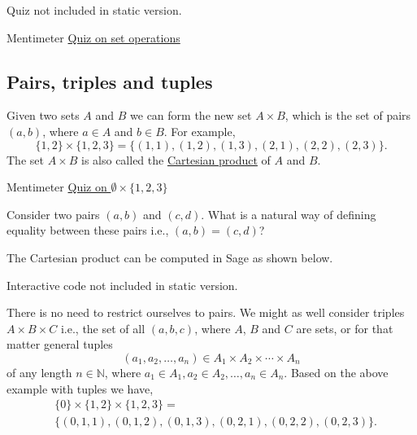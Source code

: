 \begin{quizexercise} Quiz not included in static version.\end{quizexercise}

\begin{button}{Mentimeter}
  \href{https://www.mentimeter.com/s/c8300f4a1e062e187930a642981ca957/6618572b0746}{Quiz on set operations}
\end{button}

\subsection{Pairs, triples and tuples}

Given two sets $A$ and $B$ we can form the new set $A\times B$,
which is the set of pairs $(a, b)$, where $a\in A$ and
$b\in B$. For example,
$$
  \{1, 2\}\times \{1, 2, 3\} =
  \{(1, 1), (1, 2), (1, 3), (2, 1), (2, 2), (2, 3)\}.
$$
The set $A\times B$ is also called the \href{https://en.wikipedia.org/wiki/Cartesian\_product}{Cartesian
  product} of $A$ and
$B$.

\begin{button}{Mentimeter}
  \href{https://www.mentimeter.com/s/25f76b72c0703f4e689c9a712031c3fe/72de3d52866a}{Quiz on $\emptyset\times \{1, 2, 3\}$}
\end{button}

\begin{exercise}
  Consider two pairs $(a, b)$ and $(c, d)$. What is a natural way of defining
  equality between these pairs i.e., $(a, b) = (c, d)$?
\end{exercise}

The Cartesian product can be computed in Sage as shown below.

\begin{sage} Interactive code not included in static version.\end{sage}

There is no need to restrict ourselves to pairs. We might as well
consider triples $A\times B\times C$ i.e.,
the set of all $(a, b, c)$, where $A$, $B$ and $C$ are sets, or
for that matter general tuples
$$
  (a_1, a_2, \dots, a_n)\in A_1\times A_2\times \cdots \times A_n
$$
of any length $n\in \mathbb{N}$, where $a_1\in A_1, a_2\in A_2,
  \dots, a_n\in A_n$. Based on the above example with tuples we have,
\begin{align*}
   & \{0\}\times\{1, 2\}\times \{1, 2, 3\} =                               \\
   & \{(0, 1, 1), (0, 1, 2), (0, 1, 3), (0, 2, 1), (0, 2, 2), (0, 2, 3)\}.
\end{align*}

